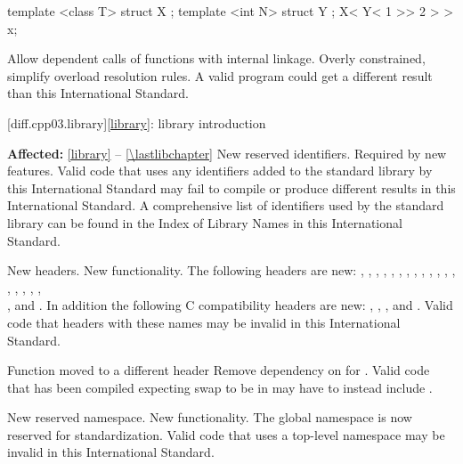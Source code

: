 \begin{codeblock}
template <class T> struct X { };
template <int N> struct Y { };
X< Y< 1 >> 2 > > x;
\end{codeblock}

\change Allow dependent calls of functions with internal linkage.
\rationale Overly constrained, simplify overload resolution rules.
\effect
A valid \CppIII{} program could get a different result than this
International Standard.

[diff.cpp03.library]{\ref{library}: library introduction}

\pnum\textbf{Affected:} \ref{library} -- \ref{\lastlibchapter}
\change New reserved identifiers.
\rationale Required by new features.
\effect
Valid \CppIII{} code that uses any identifiers added to the \Cpp{} standard
library by this International Standard may fail to compile or produce different
results in this International Standard. A comprehensive list of identifiers used
by the \Cpp{} standard library can be found in the Index of Library Names in this
International Standard.

\change New headers.
\rationale New functionality.
\effect
The following \Cpp{} headers are new:
,
,
,
,
,
,
,
,
,
,
,
,
,
,
,
,
,
,\\
,
and
.
In addition the following C compatibility headers are new:
,
,
,
and
.
Valid \CppIII{} code that  headers with these names may be
invalid in this International Standard.

\effect Function  moved to a different header
\rationale Remove dependency on  for .
\effect Valid \CppIII{} code that has been compiled expecting swap to be in
 may have to instead include .

\change New reserved namespace.
\rationale New functionality.
\effect
The global namespace  is now reserved for standardization. Valid
\CppIII{} code that uses a top-level namespace  may be invalid in
this International Standard.

